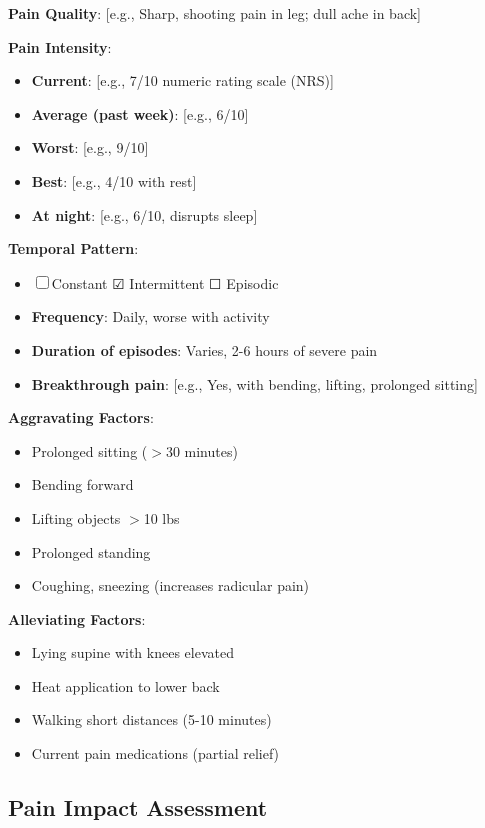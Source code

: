\documentclass[11pt,letterpaper]{article}
\begin{document}
\textbf{Pain Quality}: [e.g., Sharp, shooting pain in leg; dull ache in back]

\textbf{Pain Intensity}:
\begin{itemize}[leftmargin=*]
    \item \textbf{Current}: [e.g., 7/10 numeric rating scale (NRS)]
    \item \textbf{Average (past week)}: [e.g., 6/10]
    \item \textbf{Worst}: [e.g., 9/10]
    \item \textbf{Best}: [e.g., 4/10 with rest]
    \item \textbf{At night}: [e.g., 6/10, disrupts sleep]
\end{itemize}

\textbf{Temporal Pattern}:
\begin{itemize}[leftmargin=*]
    \item ☐ Constant ☑ Intermittent ☐ Episodic
    \item \textbf{Frequency}: Daily, worse with activity
    \item \textbf{Duration of episodes}: Varies, 2-6 hours of severe pain
    \item \textbf{Breakthrough pain}: [e.g., Yes, with bending, lifting, prolonged sitting]
\end{itemize}

\textbf{Aggravating Factors}:
\begin{itemize}[leftmargin=*]
    \item Prolonged sitting ($>$30 minutes)
    \item Bending forward
    \item Lifting objects $>$10 lbs
    \item Prolonged standing
    \item Coughing, sneezing (increases radicular pain)
\end{itemize}

\textbf{Alleviating Factors}:
\begin{itemize}[leftmargin=*]
    \item Lying supine with knees elevated
    \item Heat application to lower back
    \item Walking short distances (5-10 minutes)
    \item Current pain medications (partial relief)
\end{itemize}

\subsection*{Pain Impact Assessment}
\end{document}
